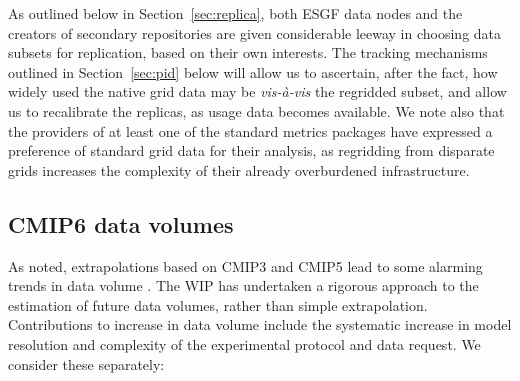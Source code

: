 \documentclass[gmd,manuscript]{copernicus}
\newcommand{\secref}[1] {\mbox{Section  \ref{sec:#1}}}
\begin{document}
As outlined below in \secref{replica}, both ESGF data nodes and the
creators of secondary repositories are given considerable leeway in
choosing data subsets for replication, based on their own interests.
The tracking mechanisms outlined in \secref{pid} below will allow us
to ascertain, after the fact, how widely used the native grid data may
be \emph{vis-\`a-vis} the regridded subset, and allow us to
recalibrate the replicas, as usage data becomes available. We note
also that the providers of at least one of the standard metrics
packages \citep[ESMValTool,][]{ref:eyringetal2016a} have expressed a
preference of standard grid data for their analysis, as regridding
from disparate grids increases the complexity of their already
overburdened infrastructure.

\subsection{CMIP6 data volumes}
\label{sec:dvol}

As noted, extrapolations based on CMIP3 and CMIP5 lead to some
alarming trends in data volume \citep[see
e.g.,][]{ref:overpecketal2011}. The WIP has undertaken a rigorous
approach to the estimation of future data volumes, rather than simple
extrapolation. Contributions to increase in data volume include the
systematic increase in model resolution and complexity of the
experimental protocol and data request. We consider these separately:
\end{document}
